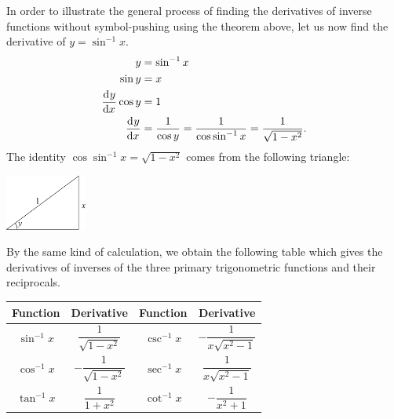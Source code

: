 \begin{ex}
  In order to illustrate the general process of finding the derivatives of inverse functions without symbol-pushing using the theorem above, let us
  now find the derivative of $ y = \sin^{-1} x $.
  \begin{align*}
    y &= \sin^{-1} x\\
    \sin y &= x\\
    \dod{y}{x} \cos y &= 1\\
    \dod{y}{x} &= \frac{1}{\cos y} = \frac{1}{\cos \sin^{-1} x} = \frac{1}{\sqrt{1 - x^2}}.
  \end{align*}
  The identity $ \cos\sin^{-1} x = \sqrt{1 - x^2} $ comes from the following triangle:
  \begin{center}
    \includegraphics[width=0.2\textwidth]{antitriangle}
  \end{center}
\end{ex}

By the same kind of calculation, we obtain the following table which gives the derivatives of inverses of the three primary trigonometric
functions and their reciprocals.
\begin{center}
  \def\arraystretch{1.8}
  \begin{tabular}{|c|c|c|c|}\hline
    \textbf{Function} & \textbf{Derivative} &
    \textbf{Function} & \textbf{Derivative}\\\hline
    $ \sin^{-1} x $ & $ \dfrac{1}{\sqrt{1 - x^2}} $ &
    $ \csc^{-1} x $ & $ -\dfrac{1}{x\sqrt{x^2 - 1}} $ \\\hline
    $ \cos^{-1} x $ & $ -\dfrac{1}{\sqrt{1 - x^2}} $ &
    $ \sec^{-1} x $ & $ \dfrac{1}{x\sqrt{x^2 - 1}} $\\\hline
    $ \tan^{-1} x $ & $ \dfrac{1}{1 + x^2} $ &
    $ \cot^{-1} x $ & $ -\dfrac{1}{x^2 + 1}$\\\hline
  \end{tabular}
\end{center}

